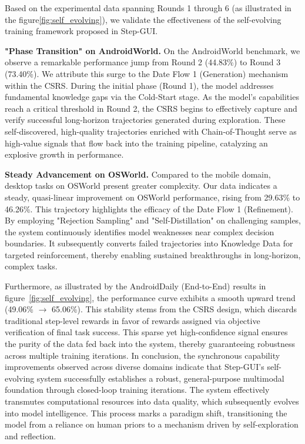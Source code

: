 Based on the experimental data spanning Rounds 1 through 6 (as illustrated in the figure\ref{fig:self_evolving}), we validate the effectiveness of the self-evolving training framework proposed in Step-GUI. 

\noindent\textbf{"Phase Transition" on AndroidWorld.}
On the AndroidWorld benchmark, we observe a remarkable performance jump from Round 2 (44.83\%) to Round 3 (73.40\%). We attribute this surge to the Date Flow 1 (Generation) mechanism within the CSRS. 
During the initial phase (Round 1), the model addresses fundamental knowledge gaps via the Cold-Start stage. 
As the model's capabilities reach a critical threshold in Round 2, the CSRS begins to effectively capture and verify successful long-horizon trajectories generated during exploration. 
These self-discovered, high-quality trajectories enriched with Chain-of-Thought serve as high-value signals that flow back into the training pipeline, catalyzing an explosive growth in performance.

\noindent\textbf{Steady Advancement on OSWorld.}
 Compared to the mobile domain, desktop tasks on OSWorld present greater complexity. 
 Our data indicates a steady, quasi-linear improvement on OSWorld performance, rising from 29.63\% to 46.26\%. 
 This trajectory highlights the efficacy of the Date Flow 1 (Refinement). 
 By employing "Rejection Sampling" and "Self-Distillation" on challenging samples, the system continuously identifies model weaknesses near complex decision boundaries.
 It subsequently converts failed trajectories into Knowledge Data for targeted reinforcement, thereby enabling sustained breakthroughs in long-horizon, complex tasks.

Furthermore, as illustrated by the AndroidDaily (End-to-End) results in figure~\ref{fig:self_evolving}, the performance curve exhibits a smooth upward trend (49.06\% $\rightarrow$ 65.06\%). 
This stability stems from the CSRS design, which discards traditional step-level rewards in favor of rewards assigned via objective verification of final task success. 
This sparse yet high-confidence signal ensures the purity of the data fed back into the system, thereby guaranteeing robustness across multiple training iterations.
In conclusion, the synchronous capability improvements observed across diverse domains indicate that Step-GUI's self-evolving system successfully establishes a robust, general-purpose multimodal foundation through closed-loop training iterations. 
The system effectively transmutes computational resources into data quality, which subsequently evolves into model intelligence. 
This process marks a paradigm shift, transitioning the model from a reliance on human priors to a mechanism driven by self-exploration and reflection.

